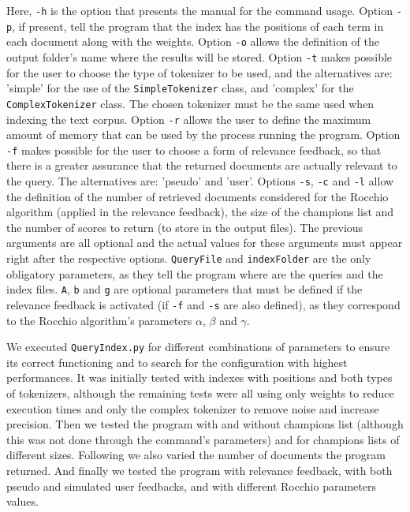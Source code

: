 \documentclass[12pt]{article}
\begin{document}
Here, \texttt{-h} is the option that presents the manual for the command usage.
Option \texttt{-p}, if present, tell the program that the index has the positions
of each term in each document along with the weights.
Option \texttt{-o} allows the definition of the output folder's name where the
results will be stored.
Option \texttt{-t} makes possible for the user to choose the type of tokenizer
to be used, and the alternatives are: 'simple' for the use of the 
\texttt{SimpleTokenizer} class, and 'complex' for the \texttt{ComplexTokenizer} class.
The chosen tokenizer must be the same used when indexing the text corpus.
Option \texttt{-r} allows the user to define the maximum amount of memory that can
be used by the process running the program.
Option \texttt{-f} makes possible for the user to choose a form of relevance 
feedback, so that there is a greater assurance that the returned documents are
actually relevant to the query.
The alternatives are: 'pseudo' and 'user'.
Options \texttt{-s}, \texttt{-c} and \texttt{-l} allow the definition of the 
number of retrieved documents considered for the Rocchio algorithm (applied in
the relevance feedback), the size of the champions list and the number of scores
to return (to store in the output files).
The previous arguments are all optional and the actual values for these arguments
must appear right after the respective options.
\texttt{QueryFile} and \texttt{indexFolder} are the only obligatory parameters,
as they tell the program where are the queries and the index files.
\texttt{A}, \texttt{b} and \texttt{g} are optional parameters that must be defined
if the relevance feedback is activated (if \texttt{-f} and \texttt{-s} are also
defined), as they correspond to the Rocchio algorithm's parameters $\alpha$,
$\beta$ and $\gamma$.

We executed \texttt{QueryIndex.py} for different combinations of parameters to
ensure its correct functioning and to search for the configuration with highest 
performances.
It was initially tested with indexes with positions and both types of tokenizers, 
although the remaining tests were all using only weights to reduce execution times
and only the complex tokenizer to remove noise and increase precision.
Then we tested the program with and without champions list (although this was
not done through the command's parameters) and for champions lists of different sizes.
Following we also varied the number of documents the program returned.
And finally we tested the program with relevance feedback, with both pseudo and
simulated user feedbacks, and with different Rocchio parameters values.
\end{document}
